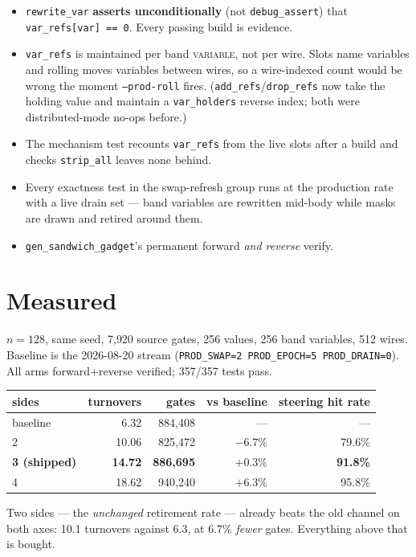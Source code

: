 \documentclass[11pt]{article}
\begin{document}
\begin{itemize}
\item \texttt{rewrite\_var} \textbf{asserts unconditionally} (not
\texttt{debug\_assert}) that \texttt{var\_refs[var] == 0}. Every passing build
is evidence.
\item \texttt{var\_refs} is maintained per band \textsc{variable}, not per
wire. Slots name variables and rolling moves variables between wires, so a
wire-indexed count would be wrong the moment \texttt{--prod-roll} fires.
(\texttt{add\_refs}/\texttt{drop\_refs} now take the holding value and maintain
a \texttt{var\_holders} reverse index; both were distributed-mode no-ops
before.)
\item The mechanism test recounts \texttt{var\_refs} from the live slots after
a build and checks \texttt{strip\_all} leaves none behind.
\item Every exactness test in the swap-refresh group runs at the production
rate with a live drain set --- band variables are rewritten mid-body while
masks are drawn and retired around them.
\item \texttt{gen\_sandwich\_gadget}'s permanent forward \emph{and reverse}
verify.
\end{itemize}

\section{Measured}

$n=128$, same seed, 7{,}920 source gates, 256 values, 256 band variables, 512
wires. Baseline is the 2026-08-20 stream (\texttt{PROD\_SWAP=2 PROD\_EPOCH=5
PROD\_DRAIN=0}). All arms forward+reverse verified; 357/357 tests pass.

\begin{center}
\begin{tabular}{lrrrr}
\toprule
sides & turnovers & gates & vs baseline & steering hit rate \\
\midrule
baseline & 6.32 & 884{,}408 & --- & --- \\
2 & 10.06 & 825{,}472 & $-6.7\%$ & 79.6\% \\
\textbf{3 (shipped)} & \textbf{14.72} & \textbf{886{,}695} & $\mathbf{+0.3\%}$ & \textbf{91.8\%} \\
4 & 18.62 & 940{,}240 & $+6.3\%$ & 95.8\% \\
\bottomrule
\end{tabular}
\end{center}

\noindent Two sides --- the \emph{unchanged} retirement rate --- already beats
the old channel on both axes: 10.1 turnovers against 6.3, at 6.7\% \emph{fewer}
gates. Everything above that is bought.
\end{document}
